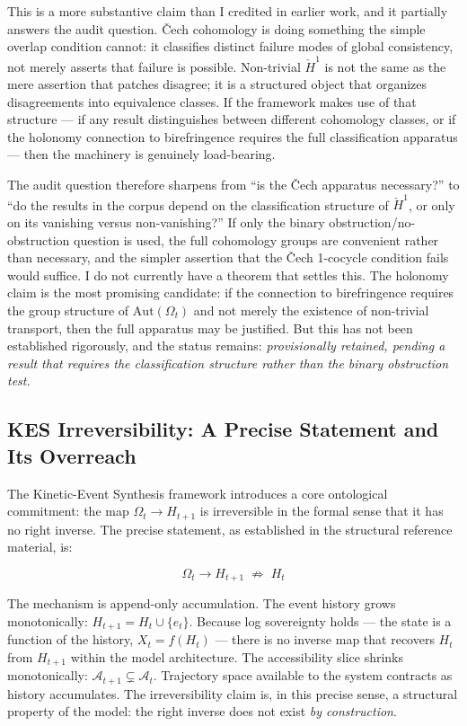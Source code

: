 \documentclass[12pt, a4paper]{article}
\begin{document}
This is a more substantive claim than I credited in earlier work, and it partially answers the audit question. \v{C}ech cohomology is doing something the simple overlap condition cannot: it classifies distinct failure modes of global consistency, not merely asserts that failure is possible. Non-trivial $\check{H}^1$ is not the same as the mere assertion that patches disagree; it is a structured object that organizes disagreements into equivalence classes. If the framework makes use of that structure --- if any result distinguishes between different cohomology classes, or if the holonomy connection to birefringence requires the full classification apparatus --- then the machinery is genuinely load-bearing.

The audit question therefore sharpens from \enquote{is the \v{C}ech apparatus necessary?} to \enquote{do the results in the corpus depend on the classification structure of $\check{H}^1$, or only on its vanishing versus non-vanishing?} If only the binary obstruction/no-obstruction question is used, the full cohomology groups are convenient rather than necessary, and the simpler assertion that the \v{C}ech 1-cocycle condition fails would suffice. I do not currently have a theorem that settles this. The holonomy claim is the most promising candidate: if the connection to birefringence requires the group structure of $\mathrm{Aut}(\Omega_t)$ and not merely the existence of non-trivial transport, then the full apparatus may be justified. But this has not been established rigorously, and the status remains: \textit{provisionally retained, pending a result that requires the classification structure rather than the binary obstruction test.}

\subsection{KES Irreversibility: A Precise Statement and Its Overreach}

The Kinetic-Event Synthesis framework introduces a core ontological commitment: the map $\Omega_t \to H_{t+1}$ is irreversible in the formal sense that it has no right inverse. The precise statement, as established in the structural reference material, is:

\[
\Omega_t \to H_{t+1} \;\not\Rightarrow\; H_t
\]

The mechanism is append-only accumulation. The event history grows monotonically: $H_{t+1} = H_t \cup \{e_t\}$. Because log sovereignty holds --- the state is a function of the history, $X_t = f(H_t)$ --- there is no inverse map that recovers $H_t$ from $H_{t+1}$ within the model architecture. The accessibility slice shrinks monotonically: $\mathcal{A}_{t+1} \subsetneq \mathcal{A}_t$. Trajectory space available to the system contracts as history accumulates. The irreversibility claim is, in this precise sense, a structural property of the model: the right inverse does not exist \textit{by construction}.
\end{document}
